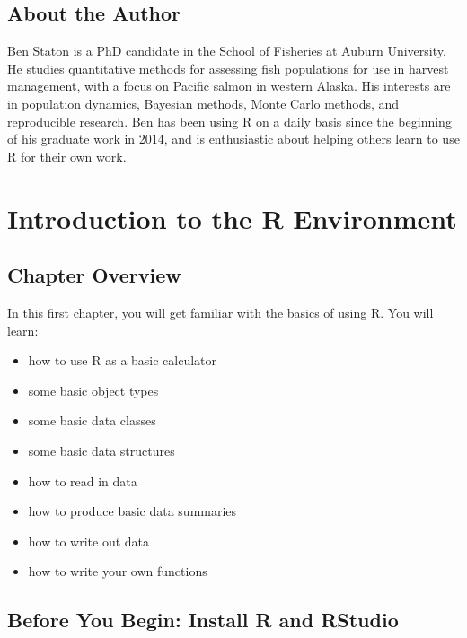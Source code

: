 \documentclass[]{book}
\providecommand{\tightlist}{%
  \setlength{\itemsep}{0pt}\setlength{\parskip}{0pt}}
\theoremstyle{definition}
\theoremstyle{definition}
\theoremstyle{definition}
\theoremstyle{remark}
\begin{document}
\section*{About the Author}\label{about-the-author}

Ben Staton is a PhD candidate in the School of Fisheries at Auburn
University. He studies quantitative methods for assessing fish
populations for use in harvest management, with a focus on Pacific
salmon in western Alaska. His interests are in population dynamics,
Bayesian methods, Monte Carlo methods, and reproducible research. Ben
has been using R on a daily basis since the beginning of his graduate
work in 2014, and is enthusiastic about helping others learn to use R
for their own work.

\chapter{Introduction to the R Environment}\label{ch1}

\section*{Chapter Overview}\label{chapter-overview}

In this first chapter, you will get familiar with the basics of using R.
You will learn:

\begin{itemize}
\tightlist
\item
  how to use R as a basic calculator
\item
  some basic object types
\item
  some basic data classes
\item
  some basic data structures
\item
  how to read in data
\item
  how to produce basic data summaries
\item
  how to write out data
\item
  how to write your own functions
\end{itemize}

\section*{Before You Begin: Install R and
RStudio}\label{before-you-begin-install-r-and-rstudio}
\end{document}
